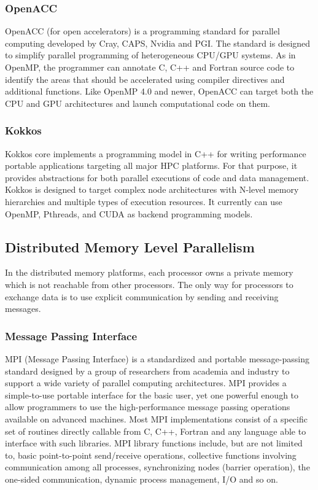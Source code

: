 \subsubsection{OpenACC}

OpenACC (for open accelerators) \cite{wienke2012openacc} is a programming standard for parallel computing developed by Cray, CAPS, Nvidia and PGI. The standard is designed to simplify parallel programming of heterogeneous CPU/GPU systems. As in OpenMP, the programmer can annotate C, C++ and Fortran source code to identify the areas that should be accelerated using compiler directives and additional functions. Like OpenMP 4.0 and newer, OpenACC can target both the CPU and GPU architectures and launch computational code on them.

\subsubsection{Kokkos}

Kokkos \cite{edwards2014kokkos} core implements a programming model in C++ for writing performance portable applications targeting all major HPC platforms. For that purpose, it provides abstractions for both parallel executions of code and data management. Kokkos is designed to target complex node architectures with N-level memory hierarchies and multiple types of execution resources. It currently can use OpenMP, Pthreads, and CUDA as backend programming models.


\subsection{Distributed Memory Level Parallelism}

In the distributed memory platforms, each processor owns a private memory which is not reachable from other processors. The only way for processors to exchange data is to use explicit communication by sending and receiving messages. 

\subsubsection{Message Passing Interface}

MPI (Message Passing Interface) \cite{gropp1999using} is a standardized and portable message-passing standard designed by a group of researchers from academia and industry to support a wide variety of parallel computing architectures. MPI provides a simple-to-use portable interface for the basic user, yet one powerful enough to allow programmers to use the high-performance message passing operations available on advanced machines. Most MPI implementations consist of a specific set of routines directly callable from C, C++, Fortran and any language able to interface with such libraries.  MPI library functions include, but are not limited to, basic point-to-point send/receive operations, collective functions involving communication among all processes, synchronizing nodes (barrier operation), the one-sided communication, dynamic process management, I/O and so on. 

